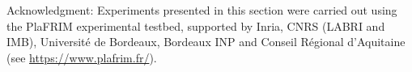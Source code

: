 \vfill

\begin{otherlanguage}{english}
Acknowledgment: Experiments presented in this section were carried out using the PlaFRIM experimental testbed, supported by Inria, CNRS (LABRI and IMB), Université de Bordeaux, Bordeaux INP and Conseil Régional d’Aquitaine (see \url{https://www.plafrim.fr/}).
\end{otherlanguage}
